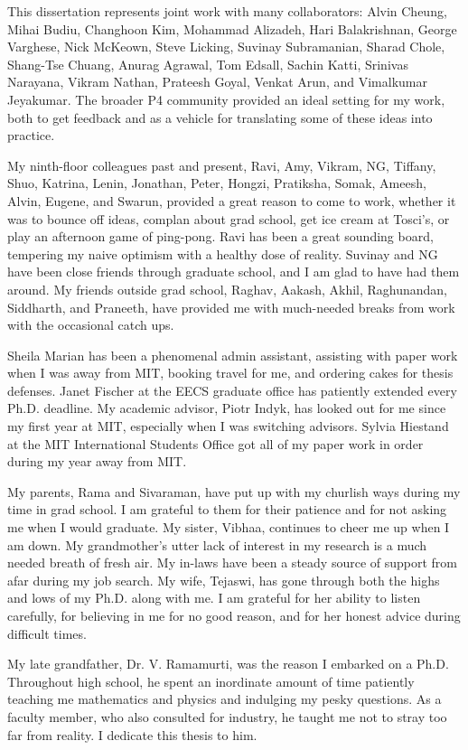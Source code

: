 This dissertation represents joint work with many collaborators: Alvin Cheung,
Mihai Budiu, Changhoon Kim, Mohammad Alizadeh, Hari Balakrishnan, George
Varghese, Nick McKeown, Steve Licking, Suvinay Subramanian, Sharad Chole,
Shang-Tse Chuang, Anurag Agrawal, Tom Edsall, Sachin Katti, Srinivas Narayana,
Vikram Nathan, Prateesh Goyal, Venkat Arun, and Vimalkumar Jeyakumar. The
broader P4 community provided an ideal setting for my work, both to get
feedback and as a vehicle for translating some of these ideas into practice. 

My ninth-floor colleagues past and present, Ravi, Amy, Vikram, NG, Tiffany,
Shuo, Katrina, Lenin, Jonathan, Peter, Hongzi, Pratiksha, Somak, Ameesh, Alvin,
Eugene, and Swarun, provided a great reason to come to work, whether it was to
bounce off ideas, complan about grad school, get ice cream at Tosci's, or play
an afternoon game of ping-pong. Ravi has been a great sounding board, tempering
my naive optimism with a healthy dose of reality. Suvinay and NG have been
close friends through graduate school, and I am glad to have had them around.
My friends outside grad school, Raghav, Aakash, Akhil, Raghunandan, Siddharth,
and Praneeth, have provided me with much-needed breaks from work with the
occasional catch ups.

Sheila Marian has been a phenomenal admin assistant, assisting with paper work
when I was away from MIT, booking travel for me, and ordering cakes for thesis
defenses. Janet Fischer at the EECS graduate office has patiently extended
every Ph.D.  deadline. My academic advisor, Piotr Indyk, has looked out for me
since my first year at MIT, especially when I was switching advisors.  Sylvia
Hiestand at the MIT International Students Office got all of my paper work in
order during my year away from MIT.

My parents, Rama and Sivaraman, have put up with my churlish ways during my
time in grad school. I am grateful to them for their patience and for not asking me when I
would graduate. My sister, Vibhaa, continues to cheer me up when I am down.  My
grandmother's utter lack of interest in my research is a much needed breath of
fresh air. My in-laws have been a steady source of support from afar during my
job search. My wife, Tejaswi, has gone through both the highs and lows of my
Ph.D. along with me. I am grateful for her ability to listen carefully, for
believing in me for no good reason, and for her honest advice during difficult
times. 

My late grandfather, Dr. V. Ramamurti, was the reason I embarked on a Ph.D.
Throughout high school, he spent an inordinate amount of time patiently
teaching me mathematics and physics and indulging my pesky questions. As a
faculty member, who also consulted for industry, he taught me not to stray too
far from reality. I dedicate this thesis to him.
